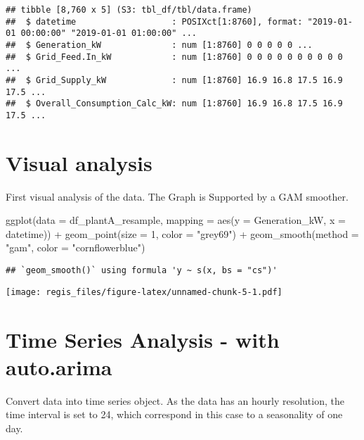 \documentclass[
]{article}
\newenvironment{Shaded}{\begin{snugshade}}{\end{snugshade}}
\newcommand{\AttributeTok}[1]{\textcolor[rgb]{0.77,0.63,0.00}{#1}}
\newcommand{\DecValTok}[1]{\textcolor[rgb]{0.00,0.00,0.81}{#1}}
\newcommand{\FunctionTok}[1]{\textcolor[rgb]{0.00,0.00,0.00}{#1}}
\newcommand{\NormalTok}[1]{#1}
\newcommand{\SpecialCharTok}[1]{\textcolor[rgb]{0.00,0.00,0.00}{#1}}
\newcommand{\StringTok}[1]{\textcolor[rgb]{0.31,0.60,0.02}{#1}}
\begin{document}
\begin{verbatim}
## tibble [8,760 x 5] (S3: tbl_df/tbl/data.frame)
##  $ datetime                   : POSIXct[1:8760], format: "2019-01-01 00:00:00" "2019-01-01 01:00:00" ...
##  $ Generation_kW              : num [1:8760] 0 0 0 0 0 ...
##  $ Grid_Feed.In_kW            : num [1:8760] 0 0 0 0 0 0 0 0 0 0 ...
##  $ Grid_Supply_kW             : num [1:8760] 16.9 16.8 17.5 16.9 17.5 ...
##  $ Overall_Consumption_Calc_kW: num [1:8760] 16.9 16.8 17.5 16.9 17.5 ...
\end{verbatim}

\hypertarget{visual-analysis}{%
\section{Visual analysis}\label{visual-analysis}}

First visual analysis of the data. The Graph is Supported by a GAM
smoother.

\begin{Shaded}
\begin{Highlighting}[]
\FunctionTok{ggplot}\NormalTok{(}\AttributeTok{data =}\NormalTok{ df\_plantA\_resample,}
  \AttributeTok{mapping =} \FunctionTok{aes}\NormalTok{(}\AttributeTok{y =}\NormalTok{ Generation\_kW, }\AttributeTok{x =}\NormalTok{ datetime)) }\SpecialCharTok{+}
  \FunctionTok{geom\_point}\NormalTok{(}\AttributeTok{size =} \DecValTok{1}\NormalTok{, }\AttributeTok{color =} \StringTok{"grey69"}\NormalTok{) }\SpecialCharTok{+}
  \FunctionTok{geom\_smooth}\NormalTok{(}\AttributeTok{method =} \StringTok{"gam"}\NormalTok{, }\AttributeTok{color =} \StringTok{"cornflowerblue"}\NormalTok{)}
\end{Highlighting}
\end{Shaded}

\begin{verbatim}
## `geom_smooth()` using formula 'y ~ s(x, bs = "cs")'
\end{verbatim}

\texttt{[image: regis\_files/figure-latex/unnamed-chunk-5-1.pdf]}

\hypertarget{time-series-analysis---with-auto.arima}{%
\section{Time Series Analysis - with
auto.arima}\label{time-series-analysis---with-auto.arima}}

Convert data into time series object. As the data has an hourly
resolution, the time interval is set to 24, which correspond in this
case to a seasonality of one day.
\end{document}
